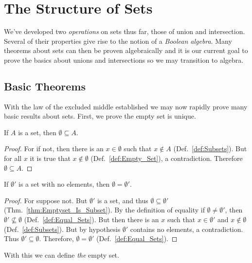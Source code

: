 \section{The Structure of Sets}
    We've developed two \textit{operations} on sets thus
    far, those of union and intersection. Several of their properties give rise
    to the notion of a \textit{Boolean algebra}. Many
    theorems about sets can then be proven algebraically and it is our current
    goal to prove the basics about unions and intersections so we may transition
    to algebra.
    \subsection{Basic Theorems}
        With the law of the excluded middle established we may now rapidly prove
        many basic results about sets. First, we prove the empty set is unique.
        \begin{theorem}
            \label{thm:Emptyset_Is_Subset}%
            If $A$ is a set, then $\emptyset\subseteq{A}$.
        \end{theorem}
        \begin{proof}
            For if not, then there is an $x\in\emptyset$ such that
            $x\notin{A}$ (Def.~\ref{def:Subsets}). But for all $x$ it is true
            that $x\notin\emptyset$ (Def.~\ref{def:Empty_Set}), a contradiction.
            Therefore $\emptyset\subseteq{A}$.
        \end{proof}
        \begin{theorem}
            \label{thm:Empty_Set_is_Unique}%
            If $\emptyset'$ is a set with no elements, then
            $\emptyset=\emptyset'$.
        \end{theorem}
        \begin{proof}
            For suppose not. But $\emptyset'$ is a set, and thus
            $\emptyset\subseteq\emptyset'$ (Thm.~\ref{thm:Emptyset_Is_Subset}).
            By the definition of equality if $\emptyset\ne\emptyset'$,
            then $\emptyset'\nsubseteq\emptyset$ (Def.~\ref{def:Equal_Sets}).
            But then there is an $x$ such that $x\in\emptyset'$ and
            $x\notin\emptyset$ (Def.~\ref{def:Subsets}). But by hypothesis
            $\emptyset'$ contains no elements, a contradiction. Thus
            $\emptyset'\subseteq\emptyset$. Therefore, $\emptyset=\emptyset'$
            (Def.~\ref{def:Equal_Sets}).
        \end{proof}
        With this we can define \textit{the} empty set.
